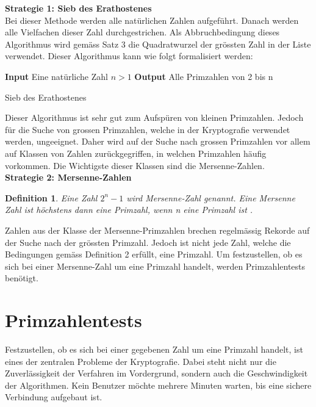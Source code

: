 \documentclass[12pt,a4paper]{article}
\newtheorem{definition}{Definition}
\begin{document}
\textbf{Strategie 1: Sieb des Erathostenes}\\
Bei dieser Methode werden alle natürlichen Zahlen aufgeführt. Danach werden alle Vielfachen dieser Zahl durchgestrichen. Als Abbruchbedingung dieses Algorithmus wird gemäss Satz 3 die Quadratwurzel der grössten Zahl in der Liste verwendet. Dieser Algorithmus kann wie folgt formalisiert werden:\\
\begin{algorithm}[H]
\SetAlgoLined
    \textbf{Input} Eine natürliche Zahl $n > 1$\;
    \textbf{Output} Alle Primzahlen von 2 bis n\;
 \caption{Sieb des Erathostenes \protect\cite{Rosen.2018}}
\end{algorithm}
Dieser Algorithmus ist sehr gut zum Aufspüren von kleinen Primzahlen. Jedoch für die Suche von grossen Primzahlen, welche in der Kryptografie verwendet werden, ungeeignet. Daher wird auf der Suche nach grossen Primzahlen vor allem auf Klassen von Zahlen zurückgegriffen, in welchen Primzahlen häufig vorkommen. Die Wichtigste dieser Klassen sind die Mersenne-Zahlen.\\

\textbf{Strategie 2: Mersenne-Zahlen}
\begin{definition}
Eine Zahl $2^{n}-1$ wird Mersenne-Zahl genannt. Eine Mersenne Zahl ist höchstens dann eine Primzahl, wenn n eine Primzahl ist \cite{Forster.2015}. 
\end{definition}
Zahlen aus der Klasse der Mersenne-Primzahlen brechen regelmässig Rekorde auf der Suche nach der grössten Primzahl. Jedoch ist nicht jede Zahl, welche die Bedingungen gemäss Definition 2 erfüllt, eine Primzahl. Um festzustellen, ob es sich bei einer Mersenne-Zahl um eine Primzahl handelt, werden Primzahlentests benötigt.

\section{Primzahlentests}
Festzustellen, ob es sich bei einer gegebenen Zahl um eine Primzahl handelt, ist eines der zentralen Probleme der Kryptografie. Dabei steht nicht nur die Zuverlässigkeit der Verfahren im Vordergrund, sondern auch die Geschwindigkeit der Algorithmen. Kein Benutzer möchte mehrere Minuten warten, bis eine sichere Verbindung aufgebaut ist.
\end{document}
